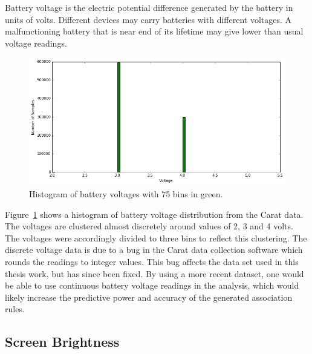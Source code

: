 Battery voltage is the electric potential difference generated by the battery in units of volts. Different devices may carry batteries with different voltages. A malfunctioning battery that is near end of its lifetime may give lower than usual voltage readings.

\begin{figure} %
	\centering
	\includegraphics[width=\textwidth]{images/carat-data/battery_voltage.png}
	\caption{Histogram of battery voltages with 75 bins in green.}
	\label{figure:carat-data-battery-voltage}
\end{figure}

Figure~\ref{figure:carat-data-battery-voltage} shows a histogram of battery voltage distribution from the Carat data. The voltages are clustered almost discretely around values of 2, 3 and 4 volts. The voltages were accordingly divided to three bins to reflect this clustering. The discrete voltage data is due to a bug in the Carat data collection software which rounds the readings to integer values. This bug affects the data set used in this thesis work, but has since been fixed. By using a more recent dataset, one would be able to use continuous battery voltage readings in the analysis, which would likely increase the predictive power and accuracy of the generated association rules.         

\subsection{Screen Brightness} \label{carat data screen}

